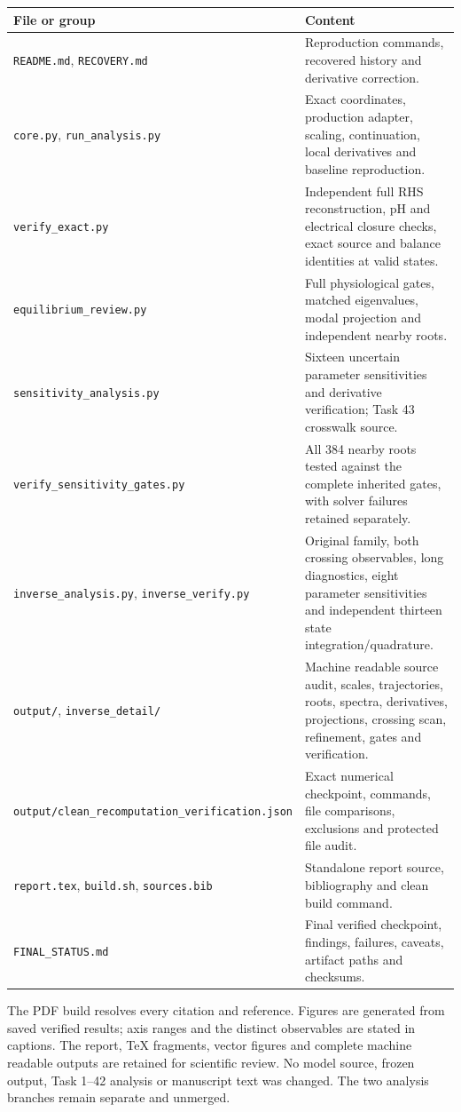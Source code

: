 \begin{longtable}{>{\raggedright\arraybackslash}p{.42\linewidth}>{\raggedright\arraybackslash}p{.51\linewidth}}
\toprule
File or group & Content\\\midrule\endhead
\texttt{README.md}, \texttt{RECOVERY.md} & Reproduction commands, recovered
history and derivative correction.\\
\texttt{core.py}, \texttt{run\_analysis.py} & Exact coordinates, production
adapter, scaling, continuation, local derivatives and baseline reproduction.\\
\texttt{verify\_exact.py} & Independent full RHS reconstruction, pH and
electrical closure checks, exact source and balance identities at valid states.\\
\texttt{equilibrium\_review.py} & Full physiological gates, matched
eigenvalues, modal projection and independent nearby roots.\\
\texttt{sensitivity\_analysis.py} & Sixteen uncertain parameter sensitivities
and derivative verification; Task 43 crosswalk source.\\
\texttt{verify\_sensitivity\_gates.py} & All 384 nearby roots tested against
the complete inherited gates, with solver failures retained separately.\\
\texttt{inverse\_analysis.py}, \texttt{inverse\_verify.py} & Original family,
both crossing observables, long diagnostics, eight parameter sensitivities
and independent thirteen state integration/quadrature.\\
\texttt{output/}, \texttt{inverse\_detail/} & Machine readable source audit,
scales, trajectories, roots, spectra, derivatives, projections, crossing scan,
refinement, gates and verification.\\
\nolinkurl{output/clean_recomputation_verification.json} & Exact numerical
checkpoint, commands, file comparisons, exclusions and protected file audit.\\
\texttt{report.tex}, \texttt{build.sh}, \texttt{sources.bib} & Standalone
report source, bibliography and clean build command.\\
\texttt{FINAL\_STATUS.md} & Final verified checkpoint, findings, failures,
caveats, artifact paths and checksums.\\\bottomrule
\end{longtable}

The PDF build resolves every citation and reference. Figures are generated
from saved verified results; axis ranges and the distinct observables are
stated in captions. The report, TeX fragments, vector figures and complete
machine readable outputs are retained for scientific review. No model
source, frozen output, Task 1--42 analysis or manuscript text was changed.
The two analysis branches remain separate and unmerged.

